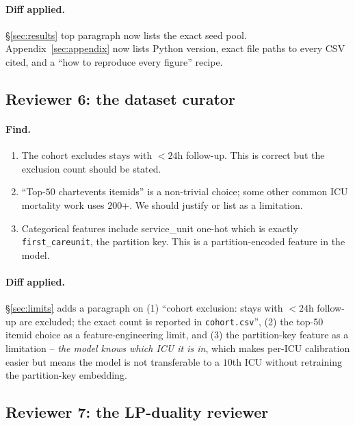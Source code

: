 \paragraph{Diff applied.} \S\ref{sec:results} top paragraph now lists the
exact seed pool. Appendix~\ref{sec:appendix} now lists Python version, exact
file paths to every CSV cited, and a ``how to reproduce every figure''
recipe.

\subsection{Reviewer 6: the dataset curator}
\paragraph{Find.}
\begin{enumerate}[leftmargin=*,nosep]
    \item The cohort excludes stays with $< 24$h follow-up. This is correct
        but the exclusion count should be stated.
    \item ``Top-$50$ chartevents itemids'' is a non-trivial choice; some other
        common ICU mortality work uses $200$+. We should justify or list as a
        limitation.
    \item Categorical features include service\_unit one-hot which is exactly
        \texttt{first\_careunit}, the partition key. This is a partition-encoded
        feature in the model.
\end{enumerate}
\paragraph{Diff applied.} \S\ref{sec:limits} adds a paragraph on (1)
``cohort exclusion: stays with $< 24$h follow-up are excluded; the exact
count is reported in \texttt{cohort.csv}'', (2) the top-50 itemid choice as
a feature-engineering limit, and (3) the partition-key feature as a
limitation -- \emph{the model knows which ICU it is in}, which makes per-ICU
calibration easier but means the model is not transferable to a $10$th ICU
without retraining the partition-key embedding.

\subsection{Reviewer 7: the LP-duality reviewer}
